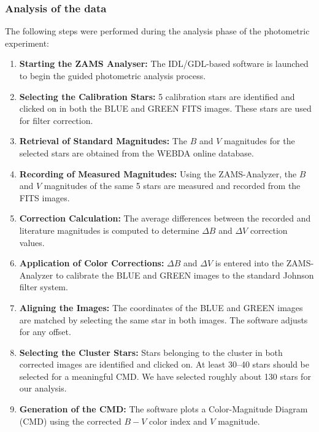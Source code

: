 \documentclass[12pt,a4paper]{article}
\begin{document}
\subsubsection{Analysis of the data}

The following steps were performed during the analysis phase of the photometric experiment:

\begin{enumerate}
    \item \textbf{Starting the ZAMS Analyser:} The IDL/GDL-based software is launched to begin the guided photometric analysis process.

    \item \textbf{Selecting the Calibration Stars:}  5 calibration stars are identified and clicked on in both the BLUE and GREEN FITS images. These stars are used for filter correction.

    \item \textbf{Retrieval of Standard Magnitudes:} The $B$ and $V$ magnitudes for the selected stars are obtained from the WEBDA online database.

    \item \textbf{Recording of Measured Magnitudes:} Using the ZAMS-Analyzer, the $B$ and $V$ magnitudes of the same 5 stars are measured and recorded from the FITS images.

    \item \textbf{Correction Calculation:} The average differences between the recorded and literature magnitudes is computed to determine $\Delta B$ and $\Delta V$ correction values.

    \item \textbf{Application of Color Corrections:} $\Delta B$ and $\Delta V$ is entered into the ZAMS-Analyzer to calibrate the BLUE and GREEN images to the standard Johnson filter system.

    \item \textbf{Aligning the Images:} The coordinates of the BLUE and GREEN images are matched by selecting the same star in both images. The software adjusts for any offset.

    \item \textbf{Selecting the Cluster Stars:} Stars belonging to the cluster in both corrected images are identified and clicked on. At least 30–40 stars should be selected for a meaningful CMD. We have selected roughly about 130 stars for our analysis.

    \item \textbf{Generation of the CMD:} The software plots a Color-Magnitude Diagram (CMD) using the corrected $B - V$ color index and $V$ magnitude.


\end{enumerate}
\end{document}
